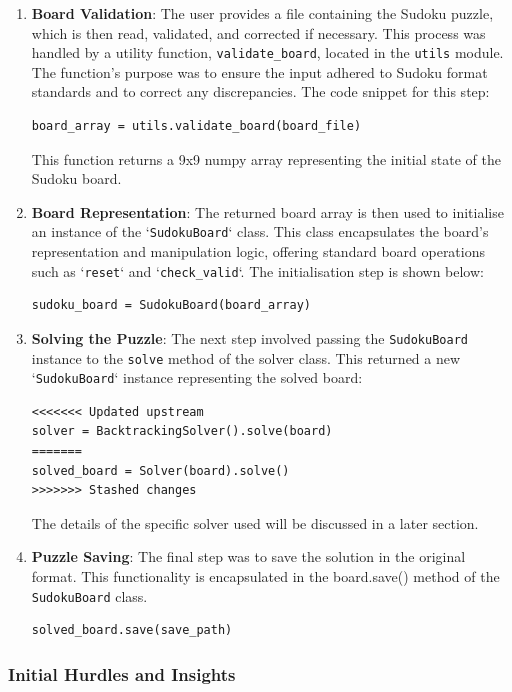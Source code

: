 \documentclass[11pt]{article}
\begin{document}
\begin{enumerate}
\item \textbf{Board Validation}: The user provides a file containing the Sudoku puzzle, which is then read, validated, and corrected if necessary. This process was handled by a utility function, \texttt{validate\_board}, located in the \texttt{utils} module. The function's purpose was to ensure the input adhered to Sudoku format standards and to correct any discrepancies. The code snippet for this step:
\begin{verbatim}
board_array = utils.validate_board(board_file)
\end{verbatim}
This function returns a 9x9 numpy array representing the initial state of the Sudoku board.

\item \textbf{Board Representation}: The returned board array is then used to initialise an instance of the `\texttt{SudokuBoard}` class. This class encapsulates the board's representation and manipulation logic, offering standard board operations such as `\texttt{reset}` and `\texttt{check\_valid}`. The initialisation step is shown below:
\begin{verbatim}
sudoku_board = SudokuBoard(board_array)
\end{verbatim}

\item \textbf{Solving the Puzzle}: The next step involved passing the \texttt{SudokuBoard} instance to the \texttt{solve} method of the solver class. This returned a new `\texttt{SudokuBoard}` instance representing the solved board:
\begin{verbatim}
<<<<<<< Updated upstream
solver = BacktrackingSolver().solve(board)
=======
solved_board = Solver(board).solve()
>>>>>>> Stashed changes
\end{verbatim}
The details of the specific solver used will be discussed in a later section.

\item \textbf{Puzzle Saving}: The final step was to save the solution in the original format. This functionality is encapsulated in the board.save() method of the \texttt{SudokuBoard} class. 
\begin{verbatim}
solved_board.save(save_path)
\end{verbatim}
\end{enumerate}

\subsubsection{Initial Hurdles and Insights}
\end{document}
